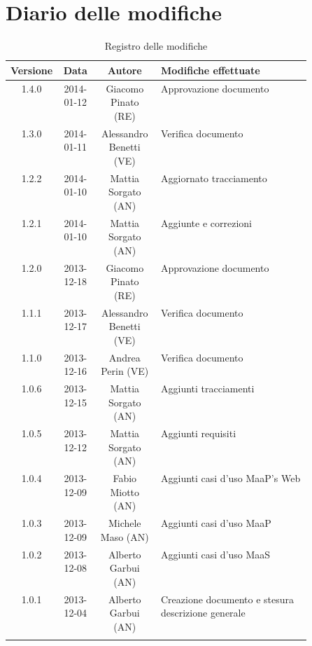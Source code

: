 
\newpage
\section{Diario delle modifiche}
\begin{center}
\begin{longtable}{|c|c|c|p{0.5\linewidth}|}
\toprule
\textbf{Versione} & \textbf{Data} & \textbf{Autore} & \textbf{Modifiche effettuate}\\


\midrule
1.4.0 & 2014-01-12 & Giacomo Pinato (RE) & Approvazione documento\\
\midrule
1.3.0 & 2014-01-11 & Alessandro Benetti (VE) & Verifica documento\\
\midrule
1.2.2 & 2014-01-10 & Mattia Sorgato (AN) & Aggiornato tracciamento\\
\midrule
1.2.1 & 2014-01-10 & Mattia Sorgato (AN) & Aggiunte e correzioni\\
\midrule
1.2.0 & 2013-12-18 & Giacomo Pinato (RE) & Approvazione documento\\
\midrule
1.1.1 & 2013-12-17 & Alessandro Benetti (VE) & Verifica documento\\
\midrule
1.1.0 & 2013-12-16 & Andrea Perin (VE) & Verifica documento\\
\midrule
1.0.6 & 2013-12-15 & Mattia Sorgato (AN) & Aggiunti tracciamenti\\
\midrule
1.0.5 & 2013-12-12 & Mattia Sorgato (AN) & Aggiunti requisiti\\
\midrule
1.0.4 & 2013-12-09 & Fabio Miotto (AN) & Aggiunti casi d'uso MaaP's Web\\
\midrule
1.0.3 & 2013-12-09 & Michele Maso (AN) & Aggiunti casi d'uso MaaP\\
\midrule
1.0.2 & 2013-12-08 & Alberto Garbui (AN) & Aggiunti casi d'uso MaaS\\
\midrule
1.0.1 & 2013-12-04 & Alberto Garbui (AN) & Creazione documento e stesura descrizione generale\\

\bottomrule
\caption{Registro delle modifiche}
\label{tab:changelog}
\end{longtable}
\end{center}

